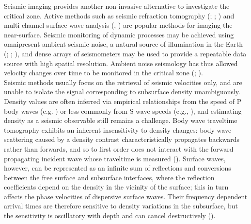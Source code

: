 \documentclass{article}
\begin{document}
	Seismic imaging provides another non-invasive alternative to investigate the critical zone. Active methods such as seismic refraction tomography (\cite{befus2011seismic}; \cite{nielson2021effect}; \cite{flinchum2022p}) and multi-channel surface wave analysis (\cite{handoyo2022geophysical}, \cite{trichandi2022combined}) are popular methods for imaging the near-surface. Seismic monitoring of dynamic processes may be achieved using omnipresent ambient seismic noise, a natural source of illumination in the Earth (\cite{curtis2006seismic}; \cite{obermann2015potential}; \cite{nakata2019seismic}), and dense arrays of seismometers may be used to provide a repeatable data source with high spatial resolution. Ambient noise seismology has thus allowed velocity changes over time to be monitored in the critical zone (\cite{james2019insights}; \cite{oakley2021seismic}). \\
	
	Seismic methods usually focus on the retrieval of seismic velocities only, and are unable to isolate the signal corresponding to subsurface density unambiguously. Density values are often inferred via empirical relationships from the speed of P body-waves (e.g. \cite{gardner1974formation}) or less commonly from S-wave speeds (e.g., \cite{miller1991relationship}), and estimating density as a seismic observable still remains a challenge. Body wave traveltime tomography exhibits an inherent insensitivity to density changes: body wave scattering caused by a density contrast characteristically propagates backwards rather than forwards, and so to first order does not interact with the forward propagating incident wave whose traveltime is measured (\cite{fichtner2010full}). Surface waves, however, can be represented as an infinite sum of reflections and conversions between the free surface and subsurface interfaces, where the reflection coefficients depend on the density in the vicinity of the surface; this in turn affects the phase velocities of dispersive surface waves. Their frequency dependent arrival times are therefore sensitive to density variations in the subsurface, but the sensitivity is oscillatory with depth and can cancel destructively (\cite{takeuchi1972seismic}).\\
	
\end{document}
